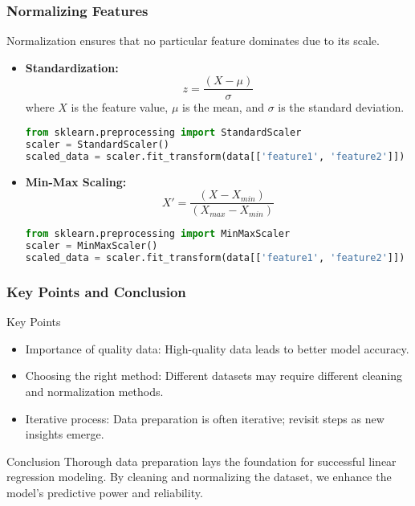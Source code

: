 \documentclass[aspectratio=169]{beamer}
\begin{document}
\begin{frame}[fragile]
    \frametitle{Normalizing Features}
    Normalization ensures that no particular feature dominates due to its scale.

    \begin{itemize}
        \item \textbf{Standardization:}
        \begin{equation}
        z = \frac{(X - \mu)}{\sigma}
        \end{equation}
        where \( X \) is the feature value, \( \mu \) is the mean, and \( \sigma \) is the standard deviation.
        \begin{lstlisting}[language=Python]
from sklearn.preprocessing import StandardScaler
scaler = StandardScaler()
scaled_data = scaler.fit_transform(data[['feature1', 'feature2']])
        \end{lstlisting}

        \item \textbf{Min-Max Scaling:}
        \begin{equation}
        X' = \frac{(X - X_{min})}{(X_{max} - X_{min})}
        \end{equation}
        \begin{lstlisting}[language=Python]
from sklearn.preprocessing import MinMaxScaler
scaler = MinMaxScaler()
scaled_data = scaler.fit_transform(data[['feature1', 'feature2']])
        \end{lstlisting}
    \end{itemize}
\end{frame}

\begin{frame}[fragile]
    \frametitle{Key Points and Conclusion}
    \begin{block}{Key Points}
        \begin{itemize}
            \item Importance of quality data: High-quality data leads to better model accuracy.
            \item Choosing the right method: Different datasets may require different cleaning and normalization methods.
            \item Iterative process: Data preparation is often iterative; revisit steps as new insights emerge.
        \end{itemize}
    \end{block}

    \begin{block}{Conclusion}
        Thorough data preparation lays the foundation for successful linear regression modeling. 
        By cleaning and normalizing the dataset, we enhance the model's predictive power and reliability.
    \end{block}
\end{frame}
\end{document}
